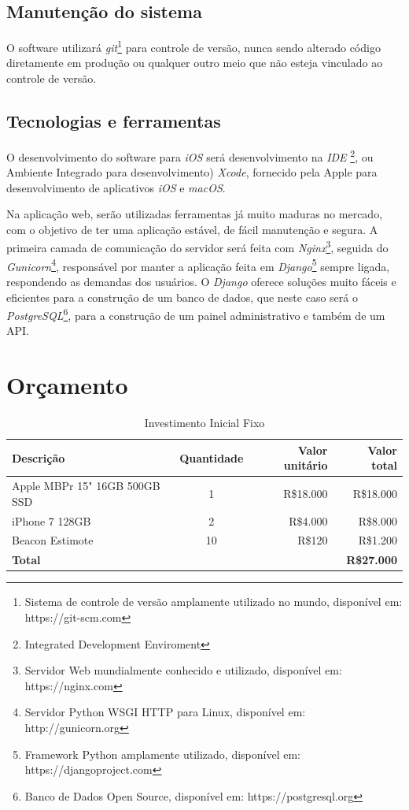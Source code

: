 \documentclass[
	12pt,
	oneside,
	a4paper,
	english,
	brazil,
]{abntex2}
\begin{document}
\section{Manutenção do sistema}

O software utilizará \emph{git}\footnote{Sistema de controle de versão amplamente utilizado no mundo, disponível em: https://git-scm.com} para controle de versão, nunca sendo alterado código diretamente em produção ou qualquer outro meio que não esteja vinculado ao controle de versão.

\section{Tecnologias e ferramentas}

O desenvolvimento do software para \emph{iOS} será desenvolvimento na \emph{IDE} \footnote{Integrated Development Enviroment}, ou Ambiente Integrado para desenvolvimento) \emph{Xcode}, fornecido pela Apple para desenvolvimento de aplicativos \emph{iOS} e \emph{macOS}.

Na aplicação web, serão utilizadas ferramentas já muito maduras no mercado, com o objetivo de ter uma aplicação estável, de fácil manutenção e segura. A primeira camada de comunicação do servidor será feita com \emph{Nginx}\footnote{Servidor Web mundialmente conhecido e utilizado, disponível em: https://nginx.com}, seguida do \emph{Gunicorn}\footnote{Servidor Python WSGI HTTP para Linux, disponível em: http://gunicorn.org}, responsável por manter a aplicação feita em \emph{Django}\footnote{Framework Python amplamente utilizado, disponível em: https://djangoproject.com} sempre ligada, respondendo as demandas dos usuários. O \emph{Django} oferece soluções muito fáceis e eficientes para a construção de um banco de dados, que neste caso será o \emph{PostgreSQL}\footnote{Banco de Dados Open Source, disponível em: https://postgresql.org}, para a construção de um painel administrativo e também de um API.



\chapter{Orçamento}

\begin{table}[ht]
\caption{Investimento Inicial Fixo}
\begin{tabular}{lcrr}
\hline\hline
Descrição & Quantidade & Valor unitário & Valor total \\ [0.5ex]
\hline
Apple MBPr 15" 16GB 500GB SSD&1&R\$18.000&R\$18.000 \\
iPhone 7 128GB&2&R\$4.000&R\$8.000 \\
Beacon Estimote&10&R\$120&R\$1.200 \\ [1ex]
\hline
\textbf{Total}&&&\textbf{R\$27.000} \\ [1ex]
\end{tabular}
\label{table:nonlin}
\end{table}
\end{document}
